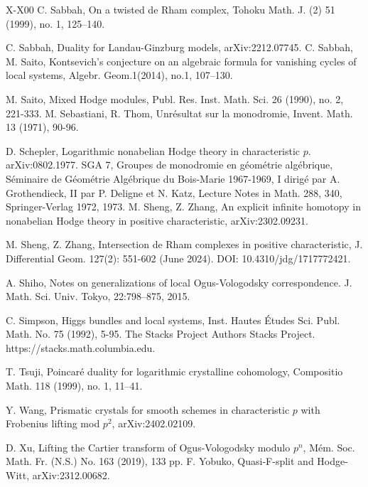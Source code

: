 \documentclass[12pt, a4paper]{article}
\begin{document}
\begin{thebibliography}{X-X00}
	 C. Sabbah, On a twisted de Rham complex, Tohoku Math. J. (2) 51 (1999), no. 1, 125–140.
	
	C. Sabbah, Duality for Landau-Ginzburg models,  arXiv:2212.07745. 
	C. Sabbah,  M. Saito,
Kontsevich's conjecture on an algebraic formula for vanishing cycles of local systems,
Algebr. Geom.1(2014), no.1, 107–130.
	
 	
	 M. Saito, Mixed Hodge modules, Publ. Res. Inst. Math. Sci. 26 (1990), no. 2, 221-333.
	M. Sebastiani, R. Thom, Unr\'esultat sur la monodromie, Invent. Math. 13 (1971), 90-96.	
 	
 	D. Schepler,  Logarithmic nonabelian Hodge theory in characteristic $p$. arXiv:0802.1977.
	SGA 7, Groupes de monodromie en g\'eom\'etrie alg\'ebrique, S\'eminaire de G\'eom\'etrie Alg\'ebrique du Bois-Marie 1967-1969, I dirig\'e par A. Grothendieck, II par P. Deligne et N. Katz, Lecture Notes in Math. 288, 340, Springer-Verlag 1972, 1973.
        M. Sheng, Z. Zhang, An explicit infinite homotopy in nonabelian Hodge theory in positive characteristic, arXiv:2302.09231.
       
       M. Sheng, Z. Zhang, Intersection de Rham complexes in positive characteristic, J. Differential Geom. 127(2): 551-602 (June 2024). DOI: 10.4310/jdg/1717772421.

       A. Shiho, Notes on generalizations of local Ogus-Vologodsky correspondence. J. Math. Sci. Univ. Tokyo, 22:798–875, 2015.
  
 	C. Simpson, Higgs bundles and local systems, Inst. Hautes \'{E}tudes Sci. Publ.
 	Math. No. 75 (1992), 5-95.
	The Stacks Project Authors Stacks Project. https://stacks.math.columbia.edu.
	
	T. Tsuji, Poincaré duality for logarithmic crystalline cohomology, Compositio Math. 118 (1999), no. 1, 11–41. 

Y. Wang, Prismatic crystals for smooth schemes in characteristic $p$ with Frobenius lifting mod $p^2$, arXiv:2402.02109.
        
 	D. Xu, Lifting the Cartier transform of Ogus-Vologodsky modulo $p^n$, Mém. Soc. Math. Fr. (N.S.) No. 163 (2019), 133 pp.
F. Yobuko, Quasi-F-split and Hodge-Witt, arXiv:2312.00682.


\end{thebibliography}
\end{document}
